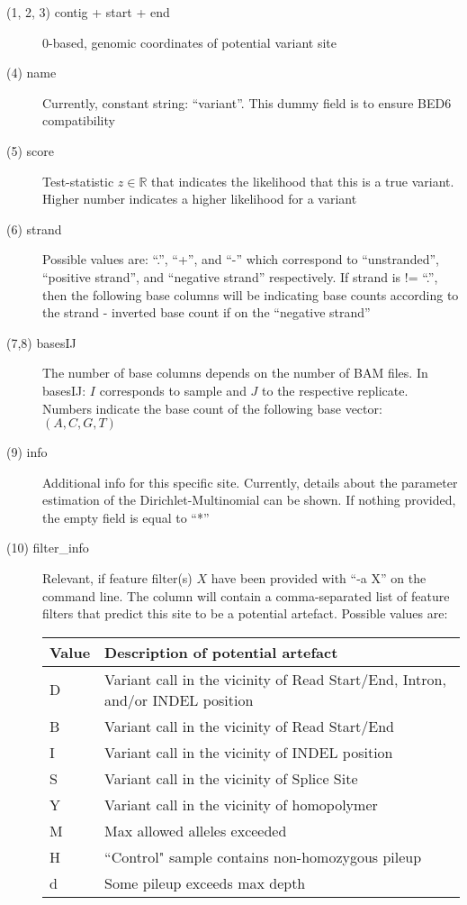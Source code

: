 \documentclass[10pt, a4paper]{article}
\begin{document}
\begin{description}
\item[(1, 2, 3) contig + start + end] 0-based, genomic coordinates of potential variant site
\item[(4) name] Currently, constant string: ``variant''. This dummy field is to ensure BED6
compatibility
\item[(5) score] Test-statistic $z \in \mathbb{R}$ that indicates the likelihood that this is a true
variant. Higher number indicates a higher likelihood for a variant
\item[(6) strand] Possible values are: ``.'', ``+'', and ``-'' which correspond to ``unstranded'',
``positive strand'', and ``negative strand'' respectively. If strand is != ``.'', then the following base columns
will be indicating base counts according to the strand - inverted base count if on the ``negative
strand''
\item[(7,8) basesIJ] The number of base columns depends on the number of BAM files. In basesIJ: $I$
corresponds to sample and $J$ to the respective replicate. Numbers indicate the base count of the
following base vector: $(A, C, G, T)$
\item[(9) info] Additional info for this specific site. Currently, details about the parameter
estimation of the Dirichlet-Multinomial can be shown. If nothing provided, the empty field is equal
to ``*''
\item[(10) filter\_info] Relevant, if feature filter(s) $X$ have been provided with ``-a X'' on the
command line. The column will contain a comma-separated list of feature filters that predict this
site to be a potential artefact. Possible values are: \\ 
\begin{tabular}{lp{}}
\textbf{Value} & \textbf{Description of potential artefact} \\
\hline
D & Variant call in the vicinity of Read Start/End, Intron, and/or INDEL position \\
B & Variant call in the vicinity of Read Start/End \\
I & Variant call in the vicinity of INDEL position \\
S & Variant call in the vicinity of Splice Site \\
Y & Variant call in the vicinity of homopolymer \\
M & Max allowed alleles exceeded \\ 
H & ``Control" sample contains non-homozygous pileup \\
d & Some pileup exceeds max depth
\end{tabular}
\end{description}
\end{document}
